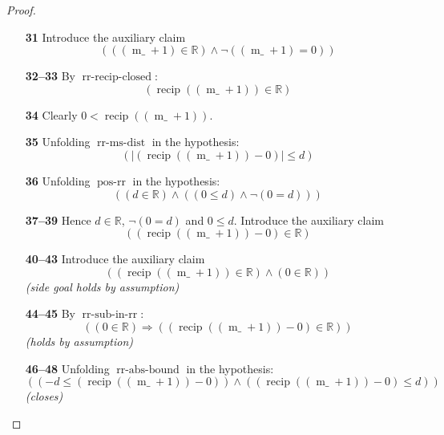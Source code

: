 \documentclass[11pt]{article}
\theoremstyle{plain}
\begin{document}
\begin{proof}
\begin{itemize}[leftmargin=2.8em, itemsep=4pt, parsep=1pt]
  \item[\textbf{31}] Introduce the auxiliary claim
\begin{equation*}
(((\operatorname{m\_} + 1) \in \mathbb{R}) \wedge \neg ((\operatorname{m\_} + 1) = 0))
\end{equation*}

  \item[\textbf{32--33}] By $\operatorname{rr\text{-}recip\text{-}closed}$:
\begin{equation*}
(\operatorname{recip}((\operatorname{m\_} + 1)) \in \mathbb{R})
\end{equation*}

  \item[\textbf{34}] Clearly $0 < \operatorname{recip}((\operatorname{m\_} + 1))$.
  \item[\textbf{35}] Unfolding $\operatorname{rr\text{-}ms\text{-}dist}$ in the hypothesis:
\begin{equation*}
(\lvert (\operatorname{recip}((\operatorname{m\_} + 1)) - 0) \rvert \leq d)
\end{equation*}

  \item[\textbf{36}] Unfolding $\operatorname{pos\text{-}rr}$ in the hypothesis:
\begin{equation*}
((d \in \mathbb{R}) \wedge ((0 \leq d) \wedge \neg (0 = d)))
\end{equation*}

  \item[\textbf{37--39}] Hence $d \in \mathbb{R}$, $\neg (0 = d)$ and $0 \leq d$. Introduce the auxiliary claim
\begin{equation*}
((\operatorname{recip}((\operatorname{m\_} + 1)) - 0) \in \mathbb{R})
\end{equation*}

  \item[\textbf{40--43}] Introduce the auxiliary claim
\begin{equation*}
((\operatorname{recip}((\operatorname{m\_} + 1)) \in \mathbb{R}) \wedge (0 \in \mathbb{R}))
\end{equation*}
  \emph{(side goal holds by assumption)}
  \item[\textbf{44--45}] By $\operatorname{rr\text{-}sub\text{-}in\text{-}rr}$:
\begin{equation*}
((0 \in \mathbb{R}) \Rightarrow ((\operatorname{recip}((\operatorname{m\_} + 1)) - 0) \in \mathbb{R}))
\end{equation*}
  \emph{(holds by assumption)}
  \item[\textbf{46--48}] Unfolding $\operatorname{rr\text{-}abs\text{-}bound}$ in the hypothesis:
\begin{equation*}
((-d \leq (\operatorname{recip}((\operatorname{m\_} + 1)) - 0)) \wedge ((\operatorname{recip}((\operatorname{m\_} + 1)) - 0) \leq d))
\end{equation*}
  \emph{(closes)}
\end{itemize}
\end{proof}
\end{document}
